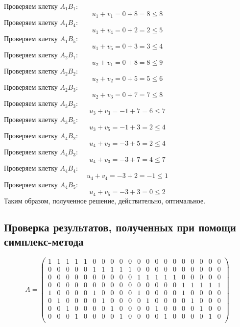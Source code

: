\documentclass{article}
\begin{document}
\noindent Проверяем клетку $A_1B_1:$
$$u_1+v_1=0+8=8 \le 8$$
\noindent Проверяем клетку $A_1B_4:$
$$u_1+v_4=0+2=2 \le 5$$
\noindent Проверяем клетку $A_1B_5:$
$$u_1+v_5=0+3=3 \le 4$$
\noindent Проверяем клетку $A_2B_1:$
$$u_2+v_1=0+8=8 \le 9$$
\noindent Проверяем клетку $A_2B_2:$
$$u_2+v_2=0+5=5 \le 6$$
\noindent Проверяем клетку $A_2B_3:$
$$u_2+v_3=0+7=7 \le 8$$
\noindent Проверяем клетку $A_3B_3:$
$$u_3+v_3=-1+7=6 \le 7$$
\noindent Проверяем клетку $A_3B_5:$
$$u_3+v_5=-1+3=2 \le 4$$
\noindent Проверяем клетку $A_4B_2:$
$$u_4+v_2=-3+5=2 \le 4$$
\noindent Проверяем клетку $A_4B_3:$
$$u_4+v_3=-3+7=4 \le 7$$
\noindent Проверяем клетку $A_4B_4:$
$$u_4+v_4=-3+2=-1 \le 1$$
\noindent Проверяем клетку $A_4B_5:$
$$u_4+v_5=-3+3=0 \le 2$$
Таким образом, полученное решение, действительно, оптимальное.



\subsection{Проверка результатов, полученных при помощи симплекс-метода}
\begin{equation*}
    A=
    \begin{pmatrix}
    1 &1 &1 &1 &1 &0 &0 &0 &0 &0 &0 &0 &0 &0 &0 &0 &0 &0 &0 &0 \\
    0 &0 &0 &0 &0 &1 &1 &1 &1 &1 &0 &0 &0 &0 &0 &0 &0 &0 &0 &0 \\
    0 &0 &0 &0 &0 &0 &0 &0 &0 &0 &1 &1 &1 &1 &1 &0 &0 &0 &0 &0 \\
    0 &0 &0 &0 &0 &0 &0 &0 &0 &0 &0 &0 &0 &0 &0 &1 &1 &1 &1 &1 \\
    1 &0 &0 &0 &0 &1 &0 &0 &0 &0 &1 &0 &0 &0 &0 &1 &0 &0 &0 &0 \\
    0 &1 &0 &0 &0 &0 &1 &0 &0 &0 &0 &1 &0 &0 &0 &0 &1 &0 &0 &0 \\
    0 &0 &1 &0 &0 &0 &0 &1 &0 &0 &0 &0 &1 &0 &0 &0 &0 &1 &0 &0 \\
    0 &0 &0 &1 &0 &0 &0 &0 &1 &0 &0 &0 &0 &1 &0 &0 &0 &0 &1 &0 \\
    \end{pmatrix}
\end{equation*}
\end{document}
